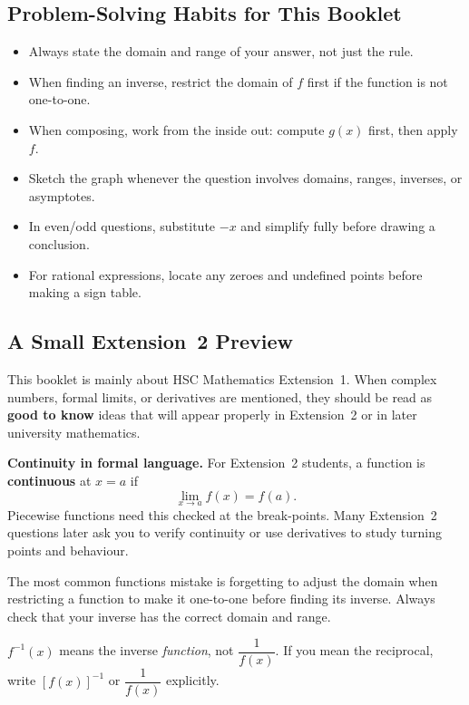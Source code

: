 \documentclass[12pt]{article}
\theoremstyle{definition}
\newenvironment{remark}[1][]{%
  \begin{remarkbox}[title={\bfseries Remark~\thetcbcounter\ifx\relax#1\relax\else\ (#1)\fi}]%
}{%
  \end{remarkbox}%
}
\begin{document}
\subsection{Problem-Solving Habits for This Booklet}
\begin{itemize}[leftmargin=*]
  \item Always state the domain and range of your answer, not just the rule.
  \item When finding an inverse, restrict the domain of $f$ first if the function is not one-to-one.
  \item When composing, work from the inside out: compute $g(x)$ first, then apply $f$.
  \item Sketch the graph whenever the question involves domains, ranges, inverses, or asymptotes.
  \item In even/odd questions, substitute $-x$ and simplify fully before drawing a conclusion.
  \item For rational expressions, locate any zeroes and undefined points before making a sign table.
\end{itemize}

\subsection{A Small Extension~2 Preview}
This booklet is mainly about HSC Mathematics Extension~1. When complex numbers, formal limits, or derivatives are mentioned, they should be read as \textbf{good to know} ideas that will appear properly in Extension~2 or in later university mathematics.

\textbf{Continuity in formal language.} For Extension~2 students, a function is \textbf{continuous} at $x = a$ if
\[
\lim_{x \to a} f(x) = f(a).
\]
Piecewise functions need this checked at the break-points. Many Extension~2 questions later ask you to verify continuity or use derivatives to study turning points and behaviour.

\begin{remark}
The most common functions mistake is forgetting to adjust the domain when restricting a function to make it one-to-one before finding its inverse. Always check that your inverse has the correct domain and range.
\end{remark}

\begin{remark}[Notation warning]
$f^{-1}(x)$ means the inverse \emph{function}, not $\dfrac{1}{f(x)}$. If you mean the reciprocal, write $[f(x)]^{-1}$ or $\dfrac{1}{f(x)}$ explicitly.
\end{remark}
\end{document}
